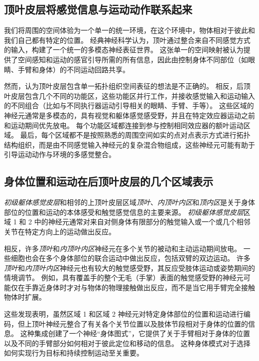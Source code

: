 \subsection{顶叶皮层将感觉信息与运动动作联系起来}

我们将周围的空间体验为一个单一的统一环境，在这个环境中，物体相对于彼此和我们自己都有特定的位置。
经典神经科学认为，顶叶通过整合来自不同感觉方式的输入，构建了一个统一的多模态神经表征世界。
这张单一的空间映射被认为提供了空间感知和运动的感官引导所需的所有信息，因此由控制身体不同部位（如眼睛、手臂和身体）的不同运动回路共享。


然而，认为顶叶皮层包含单一拓扑组织空间表征的想法是不正确的。
相反，后顶叶皮层包含几个不同的功能区，这些功能区并行工作，并接收感觉输入和运动输入的不同组合（比如与不同执行器运动引导相关的眼睛、手臂、手等）。
这些区域的神经元通常是多模态的，具有视觉和躯体感觉感受野，并且在特定效应器运动之前和运动期间优先放电。
每个功能区域都连接到参与控制相同效应器的额叶运动区域。
最后，每个区域都不是按照熟悉的周围空间如实的点对点表示方式进行拓扑结构组织，而是由不同感觉输入神经元的复杂混合物组成，这些神经元可能有助于引导运动动作与环境的多感觉整合。



\subsection{身体位置和运动在后顶叶皮层的几个区域表示}

\textit{初级躯体感觉皮层}和相邻的上顶叶皮层区域\textit{顶叶}、\textit{内顶叶内区}和\textit{顶内区}是关于身体部位的位置和运动的本体感受和触觉感觉信息的主要来源。
\textit{初级躯体感觉皮层}区域 1 和 2 中的神经元通常对来自对侧身体有限部分的触觉输入或一个或几个相邻关节在特定方向上的运动做出反应。


相反，许多\textit{顶叶}和\textit{内顶叶内区}神经元在多个关节的被动和主动运动期间放电。
一些细胞也会在多个身体部位的联合运动中做出反应，包括双臂的双边运动。
许多\textit{顶叶}和\textit{内顶叶内区}神经元也有较大的触觉感受野，其反应受肢体运动或姿势期间的情境调节。
例如，具有覆盖手的整个无毛（手掌）表面的触觉感受野的神经元可能仅在手靠近身体时才对与物体的物理接触做出反应，而不是当它用手臂完全接触物体时扩展。


这些发现表明，虽然区域 1 和区域 2 神经元对特定身体部位的位置和运动进行编码，但上顶叶神经元整合了有关各个关节位置以及肢体节段相对于身体的位置的信息。
这种集成创建了一个神经“身体图式”，它提供了关于手臂相对于身体的位置以及不同的手臂部分如何相对于彼此定位和移动的信息。
这种身体模式对于选择如何实现行为目标和持续控制运动至关重要。


